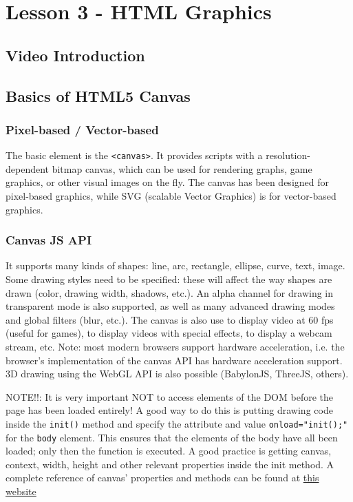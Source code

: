 \documentclass[a4paper,11pt]{book}
\begin{document}
\chapter{Lesson 3 - HTML Graphics}
\section{Video Introduction}
\section{Basics of HTML5 Canvas}
	\subsection{Pixel-based / Vector-based}
	The basic element is the \texttt{<canvas>}. It provides scripts with a resolution-dependent
	bitmap canvas, which can be used for rendering graphs, game graphics, or other visual images
	on the fly. The canvas has been designed for pixel-based graphics, while SVG (scalable
	Vector Graphics) is for vector-based graphics.
	
	\subsection{Canvas JS API}
	It supports many kinds of shapes: line, arc, rectangle, ellipse, curve, text, image.
	Some drawing styles need to be specified: these will affect the way shapes are drawn
	(color, drawing width, shadows, etc.). An alpha channel for drawing in transparent mode
	is also supported, as well as many advanced drawing modes and global filters (blur, etc.).
	The canvas is also use to display video at 60 fps (useful for games), to display videos
	with special effects, to display a webcam stream, etc. Note: most modern browsers support
	hardware acceleration, i.e. the browser's implementation of the canvas API has hardware
	acceleration support. 3D drawing using the WebGL API is also possible (BabylonJS, ThreeJS,
	others).

	NOTE!!: It is very important NOT to access elements of the DOM before the
	page has
	been loaded entirely! A good way to do this is putting drawing code inside the
	\texttt{init()}
	method and specify the attribute and value \texttt{onload="init();"} for the
	\texttt{body} element. This ensures that the elements of the body have all been
	loaded; only then the function is executed.
	A good practice is getting canvas, context, width, height and
	other relevant properties inside the init method.
	A complete reference of canvas' properties and methods can be
	found at \href{https://simon.html5.org/dump/html5-canvas-cheat-sheet.html}{this website}
	
\end{document}
